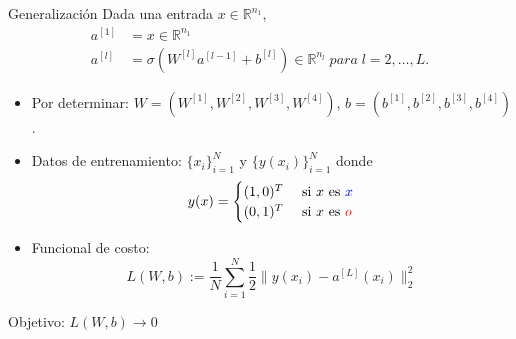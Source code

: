 \documentclass[aspectratio=1610]{beamer}
\begin{document}
\begin{frame}{Generalización}
Dada una entrada $x\in \mathbb{R}^{n_1}$,
\begin{align*}
  a^{[1]} & = x\in \mathbb{R}^{n_1} \\
  a^{[l]} & = \sigma \left( W^{[l]}a^{[l-1]}+ b^{[l]} \right) \in \mathbb{R}^{n_l} \; para \; l=2,\ldots, L.
\end{align*}





  \begin{itemize}
  \item  Por determinar:  $W = (W^{[1]},W^{[2]},W^{[3]},W^{[4]})$, $b=(b^{[1]},b^{[2]},b^{[3]},b^{[4]})$.
  \item Datos de entrenamiento: $\{x_i\}_{i=1}^N$ y $\{y(x_i)\}_{i=1}^N$ donde
 \begin{displaymath}
      y(x) =
      \begin{cases}
        (1,0)^T & \textnormal{ si } x \textnormal{ es }  \color{blue} x  \\
        (0,1)^T &  \textnormal{ si }  x \textnormal{ es }  \color{red} o
      \end{cases}
    \end{displaymath}
  \item Funcional de costo:
    \begin{displaymath}
      L(W,b):=   \frac{1}{N} \sum_{i=1}^N \frac{1}{2} \| y(x_i) - a^{[L]}(x_i) \|_2^2
    \end{displaymath}
  \end{itemize}

  Objetivo: $L(W,b)\to 0$
    
  \end{frame}
\end{document}
